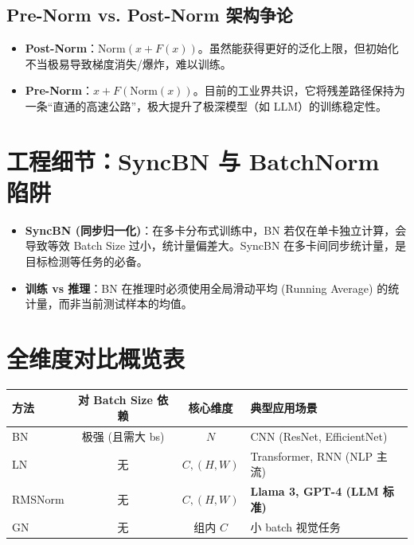 \documentclass[12pt, a4paper]{article}
\begin{document}
\subsection{Pre-Norm vs. Post-Norm 架构争论}
\begin{itemize}
    \item \textbf{Post-Norm}：$\text{Norm}(x + F(x))$。虽然能获得更好的泛化上限，但初始化不当极易导致梯度消失/爆炸，难以训练。
    \item \textbf{Pre-Norm}：$x + F(\text{Norm}(x))$。目前的工业界共识，它将残差路径保持为一条“直通的高速公路”，极大提升了极深模型（如 LLM）的训练稳定性。
\end{itemize}

\section{工程细节：SyncBN 与 BatchNorm 陷阱}
\begin{itemize}
    \item \textbf{SyncBN (同步归一化)}：在多卡分布式训练中，BN 若仅在单卡独立计算，会导致等效 Batch Size 过小，统计量偏差大。SyncBN 在多卡间同步统计量，是目标检测等任务的必备。
    \item \textbf{训练 vs 推理}：BN 在推理时必须使用全局滑动平均 (Running Average) 的统计量，而非当前测试样本的均值。
\end{itemize}

\section{全维度对比概览表}
\begin{table}[h]
\centering
\small
\begin{tabularx}{\textwidth}{|l|c|c|X|}
\hline
\textbf{方法} & \textbf{对 Batch Size 依赖} & \textbf{核心维度} & \textbf{典型应用场景} \\
\hline
BN & 极强 (且需大 bs) & $N$ & CNN (ResNet, EfficientNet) \\
\hline
LN & 无 & $C, (H, W)$ & Transformer, RNN (NLP 主流) \\
\hline
RMSNorm & 无 & $C, (H, W)$ & \textbf{Llama 3, GPT-4 (LLM 标准)} \\
\hline
GN & 无 & 组内 $C$ & 小 batch 视觉任务 \\
\hline
\end{tabularx}
\end{table}
\end{document}
